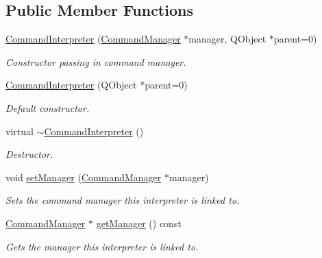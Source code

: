 \subsection*{Public Member Functions}
\begin{DoxyCompactItemize}
\item 
\hyperlink{class_command_interpreter_a2c4a8e2eda99345e3872ce67d7a24b4c}{Command\-Interpreter} (\hyperlink{class_command_manager}{Command\-Manager} $\ast$manager, Q\-Object $\ast$parent=0)
\begin{DoxyCompactList}\small\item\em Constructor passing in command manager. \end{DoxyCompactList}\item 
\hyperlink{class_command_interpreter_aa51298547ce67732b253e2326df57ee9}{Command\-Interpreter} (Q\-Object $\ast$parent=0)
\begin{DoxyCompactList}\small\item\em Default constructor. \end{DoxyCompactList}\item 
\hypertarget{class_command_interpreter_a635c0b6f3edf51ba01f7c63b0dec3d9f}{virtual \hyperlink{class_command_interpreter_a635c0b6f3edf51ba01f7c63b0dec3d9f}{$\sim$\-Command\-Interpreter} ()}\label{class_command_interpreter_a635c0b6f3edf51ba01f7c63b0dec3d9f}

\begin{DoxyCompactList}\small\item\em Destructor. \end{DoxyCompactList}\item 
void \hyperlink{class_command_interpreter_a33b0c2829ced949a655ba689bedf97f5}{set\-Manager} (\hyperlink{class_command_manager}{Command\-Manager} $\ast$manager)
\begin{DoxyCompactList}\small\item\em Sets the command manager this interpreter is linked to. \end{DoxyCompactList}\item 
\hyperlink{class_command_manager}{Command\-Manager} $\ast$ \hyperlink{class_command_interpreter_a3c4a4c717963119e225d4043e1140d78}{get\-Manager} () const 
\begin{DoxyCompactList}\small\item\em Gets the manager this interpreter is linked to. \end{DoxyCompactList}\end{DoxyCompactItemize}

